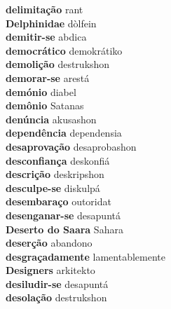 \textbf{ delimitação  } rant \\
\textbf{ Delphinidae  } dòlfein \\
\textbf{ demitir-se  } abdica \\
\textbf{ democrático  } demokrátiko \\
\textbf{ demolição  } destrukshon \\
\textbf{ demorar-se  } arestá \\
\textbf{ demónio  } diabel \\
\textbf{ demônio  } Satanas \\
\textbf{ denúncia  } akusashon \\
\textbf{ dependência  } dependensia \\
\textbf{ desaprovação  } desaprobashon \\
\textbf{ desconfiança  } deskonfiá \\
\textbf{ descrição  } deskripshon \\
\textbf{ desculpe-se  } diskulpá \\
\textbf{ desembaraço  } outoridat \\
\textbf{ desenganar-se  } desapuntá \\
\textbf{ Deserto do Saara  } Sahara \\
\textbf{ deserção  } abandono \\
\textbf{ desgraçadamente  } lamentablemente \\
\textbf{ Designers  } arkitekto \\
\textbf{ desiludir-se  } desapuntá \\
\textbf{ desolação  } destrukshon \\

